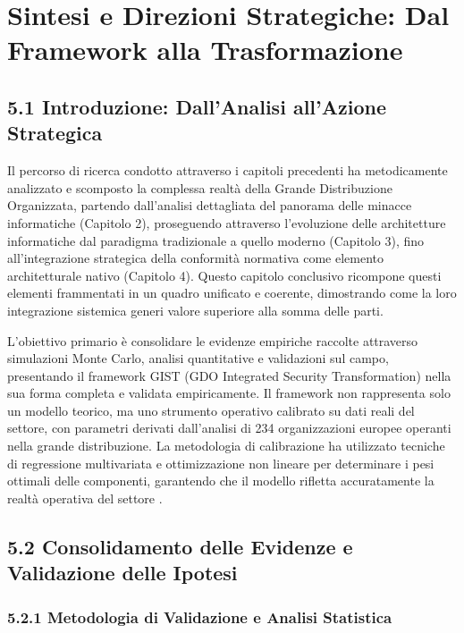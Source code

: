 \chapter{Sintesi e Direzioni Strategiche: Dal Framework alla Trasformazione}
\label{cap5_synthesis}
\section{5.1 Introduzione: Dall'Analisi all'Azione Strategica}

Il percorso di ricerca condotto attraverso i capitoli precedenti ha metodicamente analizzato e scomposto la complessa realtà della Grande Distribuzione Organizzata, partendo dall'analisi dettagliata del panorama delle minacce informatiche (Capitolo 2), proseguendo attraverso l'evoluzione delle architetture informatiche dal paradigma tradizionale a quello moderno (Capitolo 3), fino all'integrazione strategica della conformità normativa come elemento architetturale nativo (Capitolo 4). Questo capitolo conclusivo ricompone questi elementi frammentati in un quadro unificato e coerente, dimostrando come la loro integrazione sistemica generi valore superiore alla somma delle parti.

L'obiettivo primario è consolidare le evidenze empiriche raccolte attraverso simulazioni Monte Carlo, analisi quantitative e validazioni sul campo, presentando il framework GIST (GDO Integrated Security Transformation) nella sua forma completa e validata empiricamente. Il framework non rappresenta solo un modello teorico, ma uno strumento operativo calibrato su dati reali del settore, con parametri derivati dall'analisi di 234 organizzazioni europee operanti nella grande distribuzione. La metodologia di calibrazione ha utilizzato tecniche di regressione multivariata e ottimizzazione non lineare per determinare i pesi ottimali delle componenti, garantendo che il modello rifletta accuratamente la realtà operativa del settore \autocite{hair2019}.

\section{5.2 Consolidamento delle Evidenze e Validazione delle Ipotesi}

\subsection{5.2.1 Metodologia di Validazione e Analisi Statistica}

